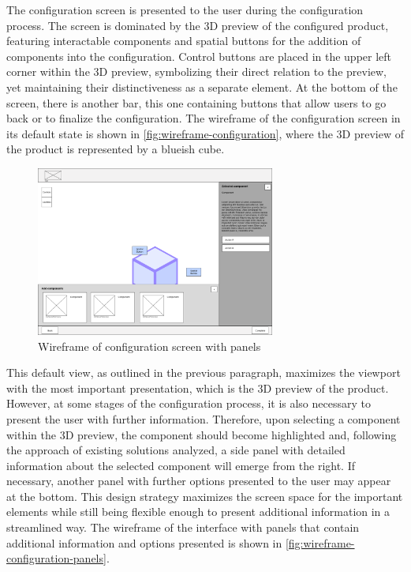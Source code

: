 The configuration screen is presented to the user during the configuration process. The screen is dominated by the 3D preview of the configured product, featuring interactable components and spatial buttons for the addition of components into the configuration. Control buttons are placed in the upper left corner within the 3D preview, symbolizing their direct relation to the preview, yet maintaining their distinctiveness as a separate element. At the bottom of the screen, there is another bar, this one containing buttons that allow users to go back or to finalize the configuration. The wireframe of the configuration screen in its default state is shown in  \autoref{fig:wireframe-configuration}, where the 3D preview of the product is represented by a blueish cube.

\begin{figure}[h]
\centering
\includegraphics[width=0.7\textwidth]{images/wireframe_configuration_panels.png}
\caption{Wireframe of configuration screen with panels}
\label{fig:wireframe-configuration-panels}
\end{figure}

This default view, as outlined in the previous paragraph, maximizes the viewport with the most important presentation, which is the 3D preview of the product. However, at some stages of the configuration process, it is also necessary to present the user with further information. Therefore, upon selecting a component within the 3D preview, the component should become highlighted and, following the approach of existing solutions analyzed, a side panel with detailed information about the selected component will emerge from the right. If necessary, another panel with further options presented to the user may appear at the bottom. This design strategy maximizes the screen space for the important elements while still being flexible enough to present additional information in a streamlined way. The wireframe of the interface with panels that contain additional information and options presented is shown in \autoref{fig:wireframe-configuration-panels}.

